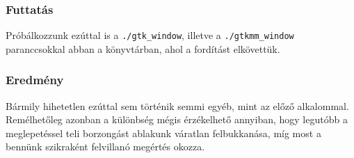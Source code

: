 \subsubsection{Futtatás}

Próbálkozzunk ezúttal is a \texttt{./gtk\_window}, illetve a \texttt{./gtkmm\_window} paranccsokkal abban a könyvtárban, ahol a fordítást elkövettük.

\subsubsection{Eredmény}

Bármily hihetetlen ezúttal sem történik semmi egyéb, mint az előző alkalommal. Remélhetőleg azonban a különbség mégis érzékelhető annyiban, hogy legutóbb a meglepetéssel teli borzongást ablakunk váratlan felbukkanása, míg most a bennünk szikraként felvillanó megértés okozza.

